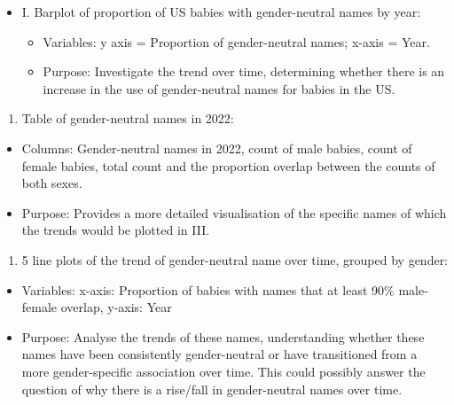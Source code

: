 \documentclass[
]{article}
\providecommand{\tightlist}{%
  \setlength{\itemsep}{0pt}\setlength{\parskip}{0pt}}
\begin{document}
\begin{itemize}
\tightlist
\item
  I. Barplot of proportion of US babies with gender-neutral names by
  year:

  \begin{itemize}
  \tightlist
  \item
    Variables: y axis = Proportion of gender-neutral names; x-axis =
    Year.
  \item
    Purpose: Investigate the trend over time, determining whether there
    is an increase in the use of gender-neutral names for babies in the
    US.
  \end{itemize}
\end{itemize}

\begin{enumerate}
\def\labelenumi{\Roman{enumi}.}
\setcounter{enumi}{1}
\tightlist
\item
  Table of gender-neutral names in 2022:
\end{enumerate}

\begin{itemize}
\tightlist
\item
  Columns: Gender-neutral names in 2022, count of male babies, count of
  female babies, total count and the proportion overlap between the
  counts of both sexes.
\item
  Purpose: Provides a more detailed visualisation of the specific names
  of which the trends would be plotted in III.
\end{itemize}

\begin{enumerate}
\def\labelenumi{\Roman{enumi}.}
\setcounter{enumi}{2}
\tightlist
\item
  5 line plots of the trend of gender-neutral name over time, grouped by
  gender:
\end{enumerate}

\begin{itemize}
\tightlist
\item
  Variables: x-axis: Proportion of babies with names that at least 90\%
  male-female overlap, y-axis: Year
\item
  Purpose: Analyse the trends of these names, understanding whether
  these names have been consistently gender-neutral or have transitioned
  from a more gender-specific association over time. This could possibly
  answer the question of why there is a rise/fall in gender-neutral
  names over time.
\end{itemize}
\end{document}

